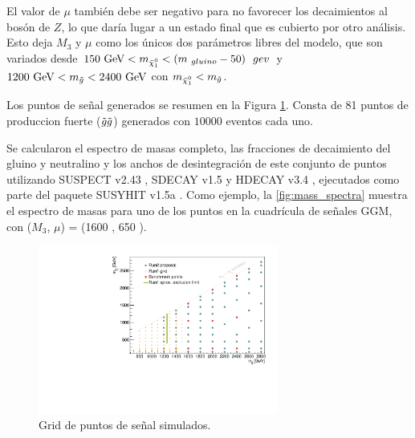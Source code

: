 El valor de $\mu$ también debe ser negativo para no favorecer los decaimientos al bosón de $Z$, lo que daría lugar a un estado final que es cubierto por otro análisis. Esto deja $M_3$ y $\mu$ como los únicos dos parámetros libres del modelo, que son variados desde $150\ \gev<m_{\ninoone}<(m_{\ gluino} - 50) \ \ gev $ y $1200\ \gev<m_{\gluino}<2400\ \gev$
con $m_{\ninoone}<m_{\gluino}$.



Los puntos de señal generados se resumen en la Figura \ref{fig:signal_grid}. Consta de 81 puntos de produccion fuerte ($\tilde{g}\tilde{g}$) generados con $10000$ eventos cada uno.


Se calcularon el espectro de masas completo, las fracciones de decaimiento del gluino y neutralino y los anchos de desintegración de este conjunto de puntos utilizando SUSPECT v2.43 \cite{Djouadi2007426}, SDECAY v1.5 \cite{Muhlleitner:2004mka} y HDECAY v3.4 \cite{Djouadi:1997yw},
ejecutados como parte del paquete SUSYHIT v1.5a \cite{Djouadi:2006bz}.
Como ejemplo, la \ref{fig:mass_spectra} muestra el espectro de masas para uno de los puntos en la cuadrícula de señales GGM, con ($M_3$, $\mu$) = (1600 {\gev}, 650 \gev). 

\begin{figure}
  \centering
  \includegraphics[width=0.7\textwidth]{images/phb_grid.pdf}
  \caption{Grid de puntos de señal simulados.}
  \label{fig:signal_grid}
\end{figure}

